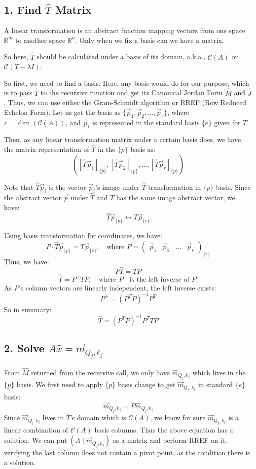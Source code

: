\documentclass[12pt, a4paper]{article}
\begin{document}
\subsection*{\color{accent} 1. Find $\hat{T}$ Matrix}
A linear transformation is an abstract function mapping vectors from one space $\mathbb{R}^m$ to another space $\mathbb{R}^n$. Only when we fix a basis can we have a matrix.

So here, $\hat{T}$ should be calculated under a basis of its domain, a.k.a., $\mathcal{C}(A)$ or $\mathcal{C}(T - \lambda I)$.

So first, we need to find a basis. Here, any basis would do for our purpose, which is to pass $\hat{T}$ to the recursive function and get its Canonical Jordan Form $\hat{M}$ and $\hat{J}$. Thus, we can use either the Gram-Schmidt algorithm or RREF (Row Reduced Echelon Form). Let us get the basis as $\{\vec{p}_1, \vec{p}_2, \dots, \vec{p}_r\}$, where $r = \dim(\mathcal{C}(A))$, and $\vec{p}_i$ is represented in the standard basis $\{e\}$ given for $T$.

Then, as any linear transformation matrix under a certain basis does, we have the matrix representation of $\hat{T}$ in the $\{p\}$ basis as:
\[
\left( [\hat{T}\vec{p}_1]_{\{p\}}, [\hat{T}\vec{p}_2]_{\{p\}}, \dots, [\hat{T}\vec{p}_r]_{\{p\}} \right)
\]

Note that $\hat{T}\vec{p}_i$ is the vector $\vec{p}_i$'s image under $\hat{T}$ transformation in $\{p\}$ basis. Since the abstract vector $\vec{p}$ under $\hat{T}$ and $T$ has the same image abstract vector, we have:
\[
\hat{T}\vec{p}_{\{p\}} \longleftrightarrow T\vec{p}_{\{e\}}
\]

Using basis transformation for coordinates, we have:
\[
P \cdot \hat{T}\vec{p}_{\{p\}} = T\vec{p}_{\{e\}}, \quad \text{where } P = \begin{pmatrix} \vec{p}_1 & \vec{p}_2 & \dots & \vec{p}_r \end{pmatrix}_{\{e\}}
\]
Thus, we have:
\[
P \hat{T} = T P
\]
\[
\hat{T} = P^+ T P, \quad \text{where } P^+ \text{ is the left inverse of } P.
\]
As $P$'s column vectors are linearly independent, the left inverse exists:
\[
P^+ = (P^T P)^{-1} P^T
\]
So in summary:
\[
\hat{T} = (P^T P)^{-1} P^T T P
\]

\subsection*{\color{accent} 2. Solve $A\hat{x} = \vec{m}_{Q_j, k_j}$}
From $\hat{M}$ returned from the recursive call, we only have $\hat{m}_{Q_j, k_j}$ which lives in the $\{p\}$ basis. We first need to apply $\{p\}$ basis change to get $\vec{m}_{Q_j, k_j}$ in standard $\{e\}$ basis:
\[
\vec{m}_{Q_j, k_j} = P \hat{m}_{Q_j, k_j}
\]
Since $\vec{m}_{Q_j, k_j}$ lives in $\hat{T}$'s domain which is $\mathcal{C}(A)$, we know for sure $\vec{m}_{Q_j, k_j}$ is a linear combination of $\mathcal{C}(A)$ basis columns. Thus the above equation has a solution. We can put $(A \mid \vec{m}_{Q_j, k_j})$ as a matrix and perform RREF on it, verifying the last column does not contain a pivot point, as the condition there is a solution.
\end{document}
